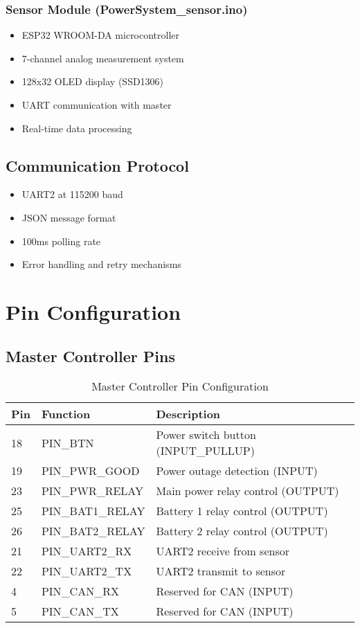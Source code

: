 \documentclass[11pt,a4paper]{article}
\begin{document}
\subsubsection{Sensor Module (PowerSystem\_sensor.ino)}
\begin{itemize}
    \item ESP32 WROOM-DA microcontroller
    \item 7-channel analog measurement system
    \item 128x32 OLED display (SSD1306)
    \item UART communication with master
    \item Real-time data processing
\end{itemize}

\subsection{Communication Protocol}
\begin{itemize}
    \item UART2 at 115200 baud
    \item JSON message format
    \item 100ms polling rate
    \item Error handling and retry mechanisms
\end{itemize}

\section{Pin Configuration}

\subsection{Master Controller Pins}

\begin{table}[H]
\centering
\begin{tabular}{@{}lll@{}}
\toprule
Pin & Function & Description \\ \midrule
18 & PIN\_BTN & Power switch button (INPUT\_PULLUP) \\
19 & PIN\_PWR\_GOOD & Power outage detection (INPUT) \\
23 & PIN\_PWR\_RELAY & Main power relay control (OUTPUT) \\
25 & PIN\_BAT1\_RELAY & Battery 1 relay control (OUTPUT) \\
26 & PIN\_BAT2\_RELAY & Battery 2 relay control (OUTPUT) \\
21 & PIN\_UART2\_RX & UART2 receive from sensor \\
22 & PIN\_UART2\_TX & UART2 transmit to sensor \\
4 & PIN\_CAN\_RX & Reserved for CAN (INPUT) \\
5 & PIN\_CAN\_TX & Reserved for CAN (INPUT) \\ \bottomrule
\end{tabular}
\caption{Master Controller Pin Configuration}
\end{table}
\end{document}

